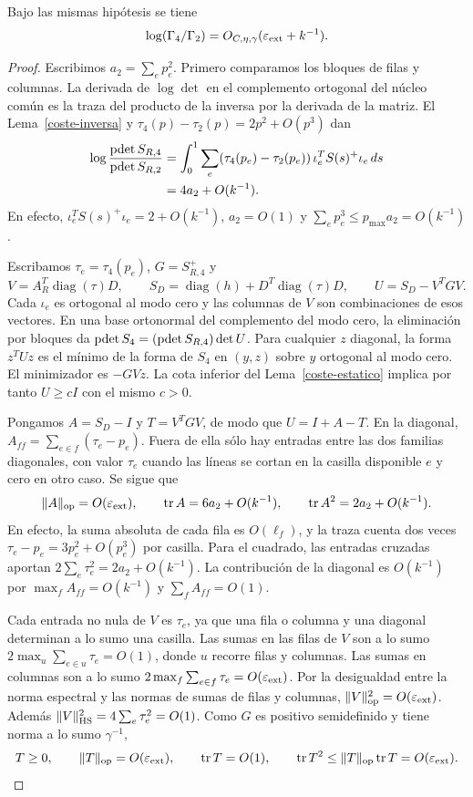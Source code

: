 \begin{proposicion}\label{coste-normalizadores}
Bajo las mismas hipótesis se tiene
\[
 \log(\Gamma_4/\Gamma_2)=O_{C,\eta,\gamma}(\varepsilon_{\rm ext}+k^{-1}).
\]
\end{proposicion}
\begin{proof}
Escribimos $a_2=\sum_e p_e^2$. Primero comparamos los bloques de filas y columnas. La derivada de
$\log\det$ en el complemento
ortogonal del núcleo común es la traza del producto de la inversa por la derivada de la matriz. El
Lema~\ref{coste-inversa} y $\tau_4(p)-\tau_2(p)=2p^2+O(p^3)$ dan
\[
 \begin{split}
 \log\frac{\operatorname{pdet} S_{R,4}}{\operatorname{pdet} S_{R,2}}
 &=\int_0^1\sum_e(\tau_4(p_e)-\tau_2(p_e))\,
                   \iota_e^TS(s)^+\iota_e\,ds\\
 &=4a_2+O(k^{-1}).
 \end{split}
\]
En efecto, $\iota_e^TS(s)^+\iota_e=2+O(k^{-1})$,
$a_2=O(1)$ y $\sum_e p_e^3\le p_{\max}a_2=O(k^{-1})$.

Escribamos $\tau_e=\tau_4(p_e)$, $G=S_{R,4}^+$ y
\[
 V=A_R^T\operatorname{diag}(\tau)D,\qquad
 S_D=\operatorname{diag}(h)+D^T\operatorname{diag}(\tau)D,\qquad
 U=S_D-V^TGV .
\]
Cada $\iota_e$ es ortogonal al modo cero y las columnas de $V$ son combinaciones de esos vectores. En
una base ortonormal del complemento del modo cero, la eliminación por bloques da
$\operatorname{pdet} S_4=(\operatorname{pdet} S_{R,4})\det U$. Para cualquier $z$ diagonal,
la forma $z^TU z$ es el mínimo de la forma de $S_4$ en $(y,z)$ sobre $y$ ortogonal al modo cero. El
minimizador es $-GVz$. La cota inferior del Lema~\ref{coste-estatico} implica por tanto $U\ge cI$ con
el mismo $c>0$.

Pongamos $A=S_D-I$ y $T=V^TGV$, de modo que $U=I+A-T$. En la diagonal,
$A_{ff}=\sum_{e\in f}(\tau_e-p_e)$. Fuera de ella sólo hay entradas entre las dos familias diagonales,
con valor $\tau_e$ cuando las líneas se cortan en la casilla disponible $e$ y cero en otro caso. Se
sigue que
\[
 \|A\|_{\rm op}=O(\varepsilon_{\rm ext}),\qquad
 \operatorname{tr}A=6a_2+O(k^{-1}),\qquad
 \operatorname{tr}A^2=2a_2+O(k^{-1}).
\]
En efecto, la suma absoluta de cada fila es $O(\ell_f)$, y la traza cuenta dos veces
$\tau_e-p_e=3p_e^2+O(p_e^3)$ por casilla. Para el cuadrado, las entradas cruzadas aportan
$2\sum_e\tau_e^2=2a_2+O(k^{-1})$. La contribución de la diagonal es $O(k^{-1})$ por $\max_f
A_{ff}=O(k^{-1})$ y $\sum_f A_{ff}=O(1)$.

Cada entrada no nula de $V$ es $\tau_e$, ya que una fila o columna y una diagonal determinan a lo sumo
una casilla. Las sumas en las filas de $V$ son a lo sumo $2\max_u\sum_{e\in u}\tau_e=O(1)$, donde $u$
recorre filas y columnas. Las sumas en columnas son a lo sumo $2\max_f\sum_{e\in
f}\tau_e=O(\varepsilon_{\rm ext})$. Por la desigualdad entre la norma espectral y las normas de sumas
de filas y columnas,
$\|V\|_{\rm op}^2=O(\varepsilon_{\rm ext})$. Además
$\|V\|_{\rm HS}^2=4\sum_e\tau_e^2=O(1)$. Como $G$ es positivo semidefinido y tiene norma a lo sumo
$\gamma^{-1}$,
\[
 T\ge0,\qquad \|T\|_{\rm op}=O(\varepsilon_{\rm ext}),\qquad
 \operatorname{tr}T=O(1),\qquad
 \operatorname{tr}T^2\le\|T\|_{\rm op}\operatorname{tr}T
             =O(\varepsilon_{\rm ext}) .
\]


\end{proof}
